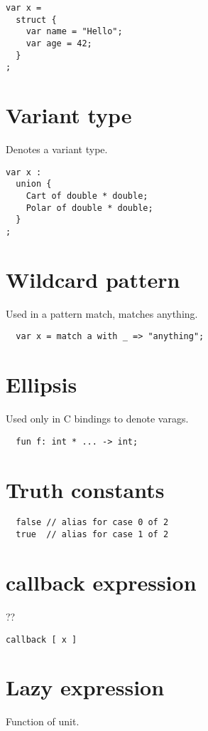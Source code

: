 \documentclass[oneside]{book}
\begin{document}
\begin{verbatim}
var x = 
  struct {
    var name = "Hello";
    var age = 42;
  }
;
\end{verbatim}


\section{Variant type}
Denotes a variant type.

\begin{verbatim}
var x : 
  union {
    Cart of double * double;
    Polar of double * double;
  }
;
\end{verbatim}


\section{Wildcard pattern}
Used in a pattern match, matches anything.

\begin{verbatim}
  var x = match a with _ => "anything";
\end{verbatim}


\section{Ellipsis}
Used only in C bindings to denote varags.

\begin{verbatim}
  fun f: int * ... -> int;
\end{verbatim}


\section{Truth constants}

\begin{verbatim}
  false // alias for case 0 of 2
  true  // alias for case 1 of 2
\end{verbatim}


\section{callback expression}
??

\begin{verbatim}
callback [ x ]
\end{verbatim}


\section{Lazy expression}
Function of unit.
\end{document}
